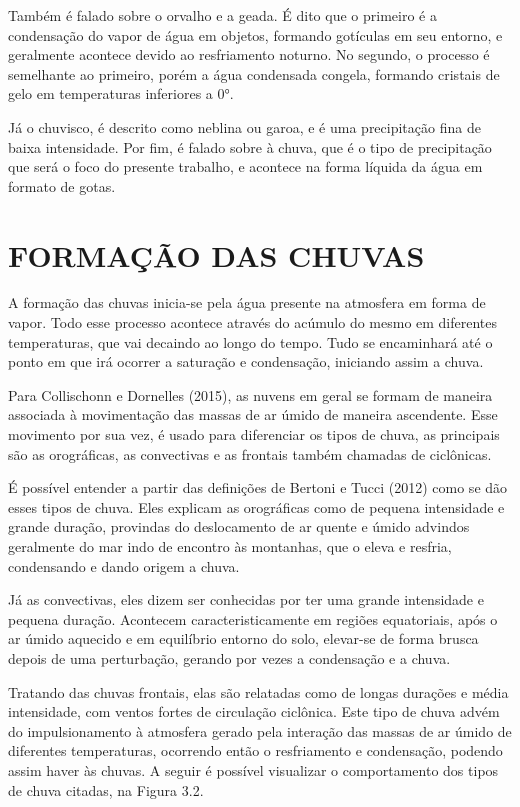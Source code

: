 Também é falado sobre o orvalho e a geada. É dito que o primeiro é a condensação do vapor de água em objetos, formando gotículas em seu entorno, e geralmente acontece devido ao resfriamento noturno. No segundo, o processo é semelhante ao primeiro, porém a água condensada congela, formando cristais de gelo em temperaturas inferiores a 0°. 

Já o chuvisco, é descrito como neblina ou garoa, e é uma precipitação fina de baixa intensidade. Por fim, é falado sobre à chuva, que é o tipo de precipitação que será o foco do presente trabalho, e acontece na forma líquida da água em formato de gotas. 

\section{FORMAÇÃO DAS CHUVAS}

A formação das chuvas inicia-se pela água presente na atmosfera em forma de vapor. Todo esse processo acontece através do acúmulo do mesmo em diferentes temperaturas, que vai decaindo ao longo do tempo. Tudo se encaminhará até o ponto em que irá ocorrer a saturação e condensação, iniciando assim a chuva. 

Para Collischonn e Dornelles (2015), as nuvens em geral se formam de maneira associada à movimentação das massas de ar úmido de maneira ascendente. Esse movimento por sua vez, é usado para diferenciar os tipos de chuva, as principais são as orográficas, as convectivas e as frontais também chamadas de ciclônicas.

É possível entender a partir das definições de Bertoni e Tucci (2012) como se dão esses tipos de chuva. Eles explicam as orográficas como de pequena intensidade e grande duração, provindas do deslocamento de ar quente e úmido advindos geralmente do mar indo de encontro às montanhas, que o eleva e resfria, condensando e dando origem a chuva. 

Já as convectivas, eles dizem ser conhecidas por ter uma grande intensidade e pequena duração. Acontecem caracteristicamente em regiões equatoriais, após o ar úmido aquecido e em equilíbrio entorno do solo, elevar-se de forma brusca depois de uma perturbação, gerando por vezes a condensação e a chuva. 

Tratando das chuvas frontais, elas são relatadas como de longas durações e média intensidade, com ventos fortes de circulação ciclônica. Este tipo de chuva advém do impulsionamento à atmosfera gerado pela interação das massas de ar úmido de diferentes temperaturas, ocorrendo então o resfriamento e condensação, podendo assim haver às chuvas. A seguir é possível visualizar o comportamento dos tipos de chuva citadas, na Figura 3.2.\bigskip

